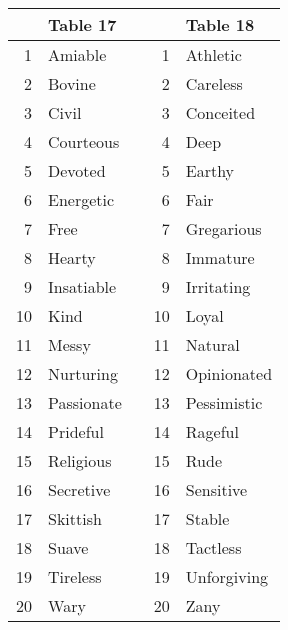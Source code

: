 \documentclass[12pt]{article}
\begin{document}
\begin{tabular}{r|l l r|l}
 & Table 17 & & & Table 18 \\\hline
 1 & Amiable & &  1 & Athletic\\
 2 & Bovine & &  2 & Careless\\
 3 & Civil & &  3 & Conceited\\
 4 & Courteous & &  4 & Deep\\
 5 & Devoted & &  5 & Earthy\\
 6 & Energetic & &  6 & Fair\\
 7 & Free & &  7 & Gregarious\\
 8 & Hearty & &  8 & Immature\\
 9 & Insatiable & &  9 & Irritating\\
10 & Kind & & 10 & Loyal\\
11 & Messy & & 11 & Natural\\
12 & Nurturing & & 12 & Opinionated\\
13 & Passionate & & 13 & Pessimistic\\
14 & Prideful & & 14 & Rageful\\
15 & Religious & & 15 & Rude\\
16 & Secretive & & 16 & Sensitive\\
17 & Skittish & & 17 & Stable\\
18 & Suave & & 18 & Tactless\\
19 & Tireless & & 19 & Unforgiving\\
20 & Wary & & 20 & Zany\\
\end{tabular}
\end{document}
